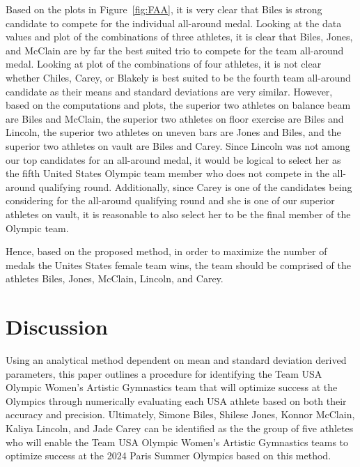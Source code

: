 \documentclass[12pt]{article}
\begin{document}
Based on the plots in Figure~\ref{fig:FAA}, it is very clear that Biles is strong candidate to 
compete for the individual all-around medal. Looking at the data values and plot of the combinations of three athletes, 
it is clear that Biles, Jones, and McClain are by far the best suited trio to compete for the team all-around medal. 
Looking at plot of the combinations of four athletes, it is not clear whether Chiles, Carey, or 
Blakely is best suited to be the fourth team all-around candidate as their means and standard deviations are very 
similar. However, based on the computations and plots, the superior two 
athletes on balance beam are Biles and McClain, the superior two athletes on floor exercise are Biles and Lincoln, 
the superior two athletes on uneven bars are Jones and Biles, and the superior two athletes on vault are Biles 
and Carey. Since Lincoln was not among our top candidates for an all-around medal, it would be logical to select her 
as the fifth United States Olympic team member who does not compete in the all-around qualifying round. Additionally, 
since Carey is one of the candidates being considering for the all-around qualifying round and she is one of our superior 
athletes on vault, it is reasonable to also select her to be the final member of the Olympic team. 

Hence, based on the proposed method, in order to maximize the number of medals the Unites States female team wins, 
the team should be comprised of the athletes Biles, Jones, McClain, Lincoln, and Carey.
 
\section{Discussion}
\label{sec:dis}

Using an analytical method dependent on mean and standard deviation derived parameters, this paper 
outlines a procedure for identifying the Team USA Olympic Women’s Artistic Gymnastics team that will optimize 
success at the Olympics through numerically evaluating each USA athlete based on both their accuracy and precision. 
Ultimately, Simone Biles, Shilese Jones, Konnor McClain, Kaliya Lincoln, and Jade Carey can be identified as the 
the group of five athletes who will enable the Team USA Olympic Women’s Artistic Gymnastics teams to optimize 
success at the 2024 Paris Summer Olympics based on this method.
\end{document}
